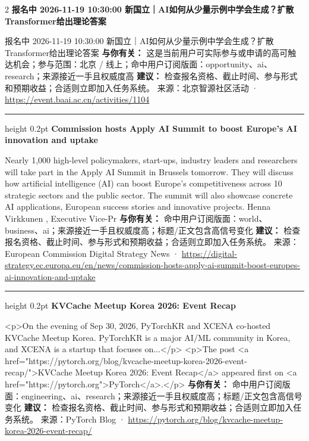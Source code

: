 \documentclass[10.5pt]{ctexart}
\begin{document}
\begin{multicols}{2}
{\large\bfseries 报名中 2026-11-19 10:30:00 新国立｜AI如何从少量示例中学会生成？扩散Transformer给出理论答案}\par
报名中 2026-11-19 10:30:00 新国立｜AI如何从少量示例中学会生成？扩散Transformer给出理论答案
\textbf{与你有关：} 这是当前用户可实际参与或申请的高可触达机会；参与范围：北京 / 线上；命中用户订阅版面：opportunity、ai、research；来源接近一手且权威度高
\textbf{建议：} 检查报名资格、截止时间、参与形式和预期收益；合适则立即加入任务系统。
{\footnotesize\color{ormuted} 来源：北京智源社区活动 · \url{https://event.baai.ac.cn/activities/1104}}
\vspace{2mm}
\hrule height 0.2pt
\vspace{2mm}
{\large\bfseries Commission hosts Apply AI Summit to boost Europe’s AI innovation and uptake}\par
Nearly 1,000 high-level policymakers, start-ups, industry leaders and researchers will take part in the Apply AI Summit in Brussels tomorrow. They will discuss how artificial intelligence (AI) can boost Europe’s competitiveness across 10 strategic sectors and the public sector. The summit will also showcase concrete AI applications, European success stories and innovative projects. Henna Virkkunen , Executive Vice-Pr
\textbf{与你有关：} 命中用户订阅版面：world、business、ai；来源接近一手且权威度高；标题/正文包含高信号变化
\textbf{建议：} 检查报名资格、截止时间、参与形式和预期收益；合适则立即加入任务系统。
{\footnotesize\color{ormuted} 来源：European Commission Digital Strategy News · \url{https://digital-strategy.ec.europa.eu/en/news/commission-hosts-apply-ai-summit-boost-europes-ai-innovation-and-uptake}}
\vspace{2mm}
\hrule height 0.2pt
\vspace{2mm}
{\large\bfseries KVCache Meetup Korea 2026: Event Recap}\par
<p>On the evening of Sep 30, 2026, PyTorchKR and XCENA co-hosted KVCache Meetup Korea. PyTorchKR is a major AI/ML community in Korea, and XCENA is a startup that focuses on...</p> <p>The post <a href="https://pytorch.org/blog/kvcache-meetup-korea-2026-event-recap/">KVCache Meetup Korea 2026: Event Recap</a> appeared first on <a href="https://pytorch.org">PyTorch</a>.</p>
\textbf{与你有关：} 命中用户订阅版面：engineering、ai、research；来源接近一手且权威度高；标题/正文包含高信号变化
\textbf{建议：} 检查报名资格、截止时间、参与形式和预期收益；合适则立即加入任务系统。
{\footnotesize\color{ormuted} 来源：PyTorch Blog · \url{https://pytorch.org/blog/kvcache-meetup-korea-2026-event-recap/}}

\end{multicols}
\end{document}

